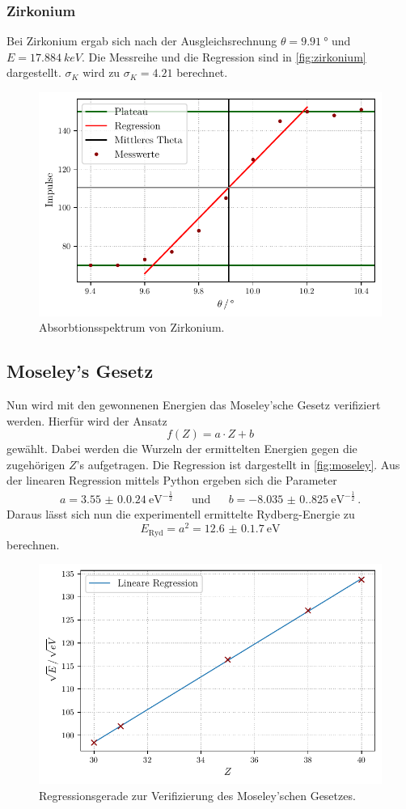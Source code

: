 \subsubsection{Zirkonium}
Bei Zirkonium ergab sich nach der Ausgleichsrechnung $\theta = \qty{9.91}{°}$ und $E = \qty{17.884}{keV}$.
Die Messreihe und die Regression sind in \autoref{fig:zirkonium} dargestellt.
$\sigma_K$ wird zu $\sigma_K = 4.21$ berechnet.
\begin{figure}[H]
  \centering
  \caption{Absorbtionsspektrum von Zirkonium.}
  \label{fig:zirkonium}
  \includegraphics[width=0.5 \linewidth]{build/zirkonium.pdf}
\end{figure}

\subsection{Moseley's Gesetz}
Nun wird mit den gewonnenen Energien das Moseley'sche Gesetz verifiziert werden.
Hierfür wird der Ansatz
\begin{equation*}
  f(Z) = a \cdot Z + b
\end{equation*}
gewählt. Dabei werden die Wurzeln der ermittelten Energien gegen die zugehörigen $Z$'s aufgetragen.
Die Regression ist dargestellt in \autoref{fig:moseley}.
Aus der linearen Regression mittels Python ergeben sich die Parameter
\begin{align*}
  a = \qty{3.55(0.024)}{\eV}^{-\frac{1}{2}} && \text{und} && b  = \qty{-8.035(0.825)}{\eV}^{-\frac{1}{2}} \, .
\end{align*}
Daraus lässt sich nun die experimentell ermittelte Rydberg-Energie zu
\begin{equation*}
  E_\text{Ryd} = a^2 = \qty{12.6(0.17)}{\eV}
\end{equation*}
berechnen.

\begin{figure}
  \centering
  \caption{Regressionsgerade zur Verifizierung des Moseley'schen Gesetzes.}
  \label{fig:moseley}
  \includegraphics[width=0.5 \linewidth]{build/moseley.pdf}
\end{figure}